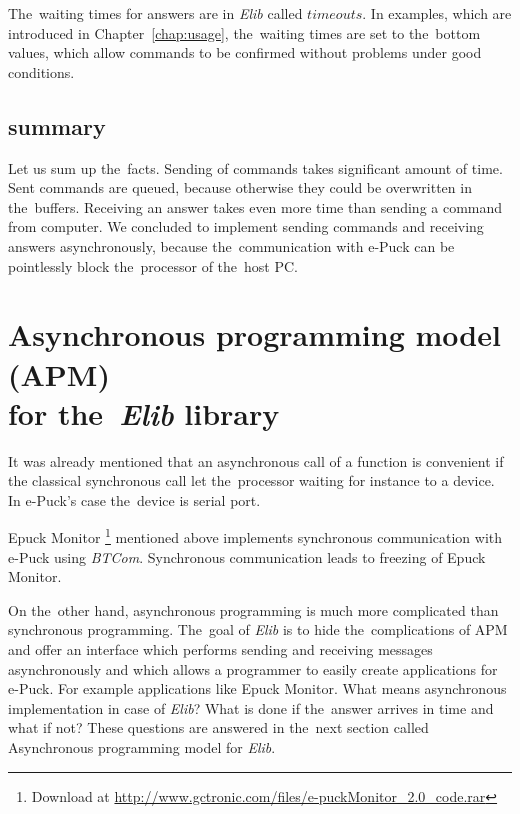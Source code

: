   \begin{definition}[Timeout]
  The~waiting times for answers are in {\it Elib} called $timeouts$.
  In examples, which are introduced in Chapter~\ref{chap:usage}, the~waiting times are set to the~bottom values,
  which allow commands to be confirmed without problems under good conditions.
  \end{definition}
  
  \subsection*{summary} %
  Let us sum up the~facts. Sending of commands takes significant amount of time.
  Sent commands are queued, because otherwise they could be overwritten in the~buffers.
  Receiving an answer takes even more time than sending a command from computer.
  We concluded to implement sending commands and receiving answers asynchronously, because the~communication with e-Puck
  can be pointlessly block the~processor of the~host PC.

\section{Asynchronous programming model (APM)\\ for the~{\it Elib} library}
  \label{sec:apm}
  It was already mentioned that an asynchronous call of a function is convenient if the
  classical synchronous call let the~processor waiting for instance to a device.
  In e-Puck's case the~device is serial port. 
   
  Epuck Monitor \footnote{\small{Download at \url{http://www.gctronic.com/files/e-puckMonitor_2.0_code.rar}}}
  mentioned above implements synchronous communication with e-Puck using {\it BTCom}.
  Synchronous communication leads to freezing of Epuck Monitor. 

  On the~other hand, asynchronous programming is much more complicated than synchronous programming.
  The~goal of {\it Elib} is to hide the~complications of APM and offer an interface
  which performs sending and receiving messages asynchronously and
  which allows a programmer to easily create applications for e-Puck. For example applications like Epuck Monitor.
  What means asynchronous implementation in case of {\it Elib}? What is done if the~answer arrives in time
  and what if not? These questions are answered in the~next section called Asynchronous programming model for {\it Elib}.

